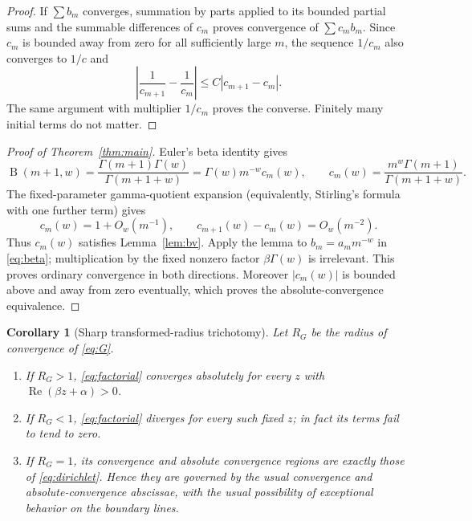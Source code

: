 \documentclass[11pt]{article}
\newtheorem{corollary}{Corollary}
\newcommand{\B}{\operatorname{B}}
\begin{document}
\begin{proof}
If $\sum b_m$ converges, summation by parts applied to its bounded partial
sums and the summable differences of $c_m$ proves convergence of
$\sum c_m b_m$.  Since $c_m$ is bounded away from zero for all sufficiently
large $m$, the sequence $1/c_m$ also converges to $1/c$ and
\[
 \left|\frac1{c_{m+1}}-\frac1{c_m}\right|
 \leq C|c_{m+1}-c_m|.
\]
The same argument with multiplier $1/c_m$ proves the converse.  Finitely many
initial terms do not matter.
\end{proof}

\begin{proof}[Proof of Theorem~\ref{thm:main}]
Euler's beta identity gives
\begin{equation}\label{eq:beta}
 \B(m+1,w)=\frac{\Gamma(m+1)\Gamma(w)}{\Gamma(m+1+w)}
 =\Gamma(w)m^{-w}c_m(w),
 \qquad
 c_m(w)=\frac{m^w\Gamma(m+1)}{\Gamma(m+1+w)}.
\end{equation}
The fixed-parameter gamma-quotient expansion (equivalently, Stirling's
formula with one further term) gives
\begin{equation}\label{eq:quotient}
 c_m(w)=1+O_w(m^{-1}),
 \qquad c_{m+1}(w)-c_m(w)=O_w(m^{-2}).
\end{equation}
Thus $c_m(w)$ satisfies Lemma~\ref{lem:bv}.  Apply the lemma to
$b_m=a_m m^{-w}$ in \eqref{eq:beta}; multiplication by the fixed nonzero
factor $\beta\Gamma(w)$ is irrelevant.  This proves ordinary convergence in
both directions.  Moreover $|c_m(w)|$ is bounded above and away from zero
eventually, which proves the absolute-convergence equivalence.
\end{proof}

\begin{corollary}[Sharp transformed-radius trichotomy]\label{cor:radius}
Let $R_G$ be the radius of convergence of \eqref{eq:G}.
\begin{enumerate}
\item If $R_G>1$, \eqref{eq:factorial} converges absolutely for every
      $z$ with $\operatorname{Re}(\beta z+\alpha)>0$.
\item If $R_G<1$, \eqref{eq:factorial} diverges for every such fixed $z$;
      in fact its terms fail to tend to zero.
\item If $R_G=1$, its convergence and absolute convergence regions are
      exactly those of \eqref{eq:dirichlet}.  Hence they are governed by the
      usual convergence and absolute-convergence abscissae, with the usual
      possibility of exceptional behavior on the boundary lines.
\end{enumerate}
\end{corollary}
\end{document}
